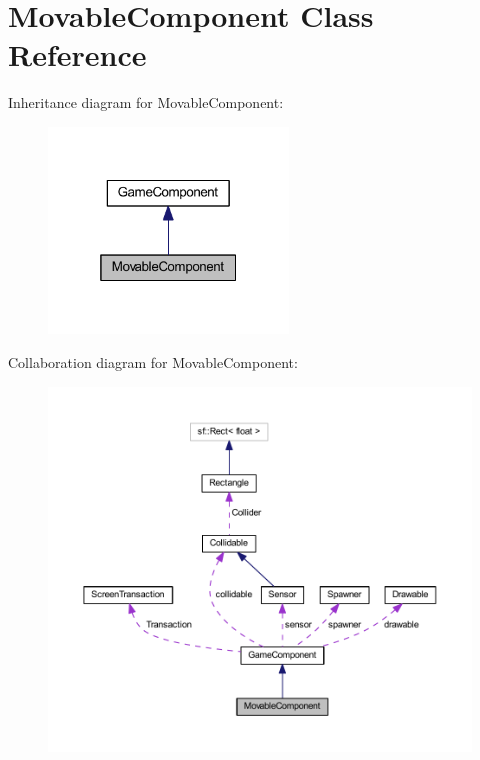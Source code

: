 \hypertarget{class_movable_component}{\section{Movable\-Component Class Reference}
\label{class_movable_component}
}


Inheritance diagram for Movable\-Component\-:\nopagebreak
\begin{figure}[H]
\begin{center}
\leavevmode
\includegraphics[width=181pt]{class_movable_component__inherit__graph}
\end{center}
\end{figure}


Collaboration diagram for Movable\-Component\-:\nopagebreak
\begin{figure}[H]
\begin{center}
\leavevmode
\includegraphics[width=350pt]{class_movable_component__coll__graph}
\end{center}
\end{figure}
